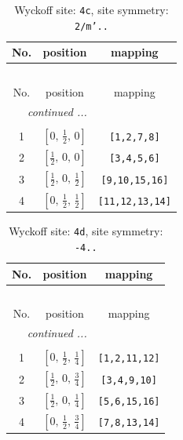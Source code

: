 \documentclass[fleqn,8pt]{jsarticle}
\begin{document}
\renewcommand{\arraystretch}{1.2}
\begin{longtable}{ccc}
\caption{Wyckoff site: {\tt 4c}, site symmetry: {\tt 2/m'..}}
 \\
 \hline \hline
No. & position & mapping \\ \hline \endfirsthead

\multicolumn{2}{l}{\tablename\ \thetable{}} \\
 \hline \hline
No. & position & mapping \\ \hline \endhead

 \hline \hline
\multicolumn{2}{r}{\footnotesize\it continued ...} \\ \endfoot

 \hline \hline
\multicolumn{2}{r}{} \\ \endlastfoot

1 & $\left[ 0,\, \frac{1}{2},\, 0 \right]$ & {\tt [1,2,7,8]} \\ \hline
2 & $\left[ \frac{1}{2},\, 0,\, 0 \right]$ & {\tt [3,4,5,6]} \\ \hline
3 & $\left[ \frac{1}{2},\, 0,\, \frac{1}{2} \right]$ & {\tt [9,10,15,16]} \\ \hline
4 & $\left[ 0,\, \frac{1}{2},\, \frac{1}{2} \right]$ & {\tt [11,12,13,14]} \\
\end{longtable}
\renewcommand{\arraystretch}{1.2}
\begin{longtable}{ccc}
\caption{Wyckoff site: {\tt 4d}, site symmetry: {\tt -4..}}
 \\
 \hline \hline
No. & position & mapping \\ \hline \endfirsthead

\multicolumn{2}{l}{\tablename\ \thetable{}} \\
 \hline \hline
No. & position & mapping \\ \hline \endhead

 \hline \hline
\multicolumn{2}{r}{\footnotesize\it continued ...} \\ \endfoot

 \hline \hline
\multicolumn{2}{r}{} \\ \endlastfoot

1 & $\left[ 0,\, \frac{1}{2},\, \frac{1}{4} \right]$ & {\tt [1,2,11,12]} \\ \hline
2 & $\left[ \frac{1}{2},\, 0,\, \frac{3}{4} \right]$ & {\tt [3,4,9,10]} \\ \hline
3 & $\left[ \frac{1}{2},\, 0,\, \frac{1}{4} \right]$ & {\tt [5,6,15,16]} \\ \hline
4 & $\left[ 0,\, \frac{1}{2},\, \frac{3}{4} \right]$ & {\tt [7,8,13,14]} \\
\end{longtable}
\end{document}

